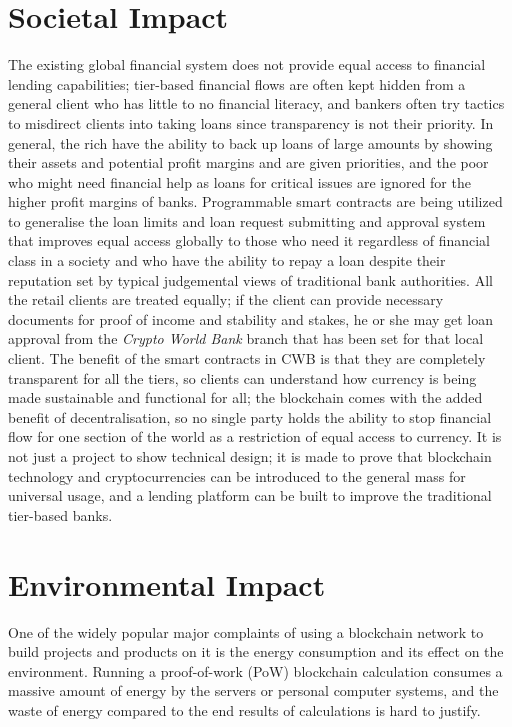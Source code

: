\documentclass[12pt,a4paper]{report}
\begin{document}
\section{Societal Impact}
\label{sec:societal-impact}
The existing global financial system does not provide equal access to financial lending capabilities; tier-based financial flows are often kept hidden from a general client who has little to no financial literacy, and bankers often try tactics to misdirect clients into taking loans since transparency is not their priority. In general, the rich have the ability to back up loans of large amounts by showing their assets and potential profit margins and are given priorities, and the poor who might need financial help as loans for critical issues are ignored for the higher profit margins of banks. Programmable smart contracts are being utilized to generalise the loan limits and loan request submitting and approval system that improves equal access globally to those who need it regardless of financial class in a society and who have the ability to repay a loan despite their reputation set by typical judgemental views of traditional bank authorities. All the retail clients are treated equally; if the client can provide necessary documents for proof of income and stability and stakes, he or she may get loan approval from the \textit{Crypto World Bank} branch that has been set for that local client. The benefit of the smart contracts in CWB is that they are completely transparent for all the tiers, so clients can understand how currency is being made sustainable and functional for all; the blockchain comes with the added benefit of decentralisation, so no single party holds the ability to stop financial flow for one section of the world as a restriction of equal access to currency. It is not just a project to show technical design; it is made to prove that blockchain technology and cryptocurrencies can be introduced to the general mass for universal usage, and a lending platform can be built to improve the traditional tier-based banks.

\section{Environmental Impact}
\label{sec:environmental-impact}
One of the widely popular major complaints of using a blockchain network to build projects and products on it is the energy consumption and its effect on the environment. Running a proof-of-work (PoW) blockchain calculation consumes a massive amount of energy by the servers or personal computer systems, and the waste of energy compared to the end results of calculations is hard to justify.
\end{document}
